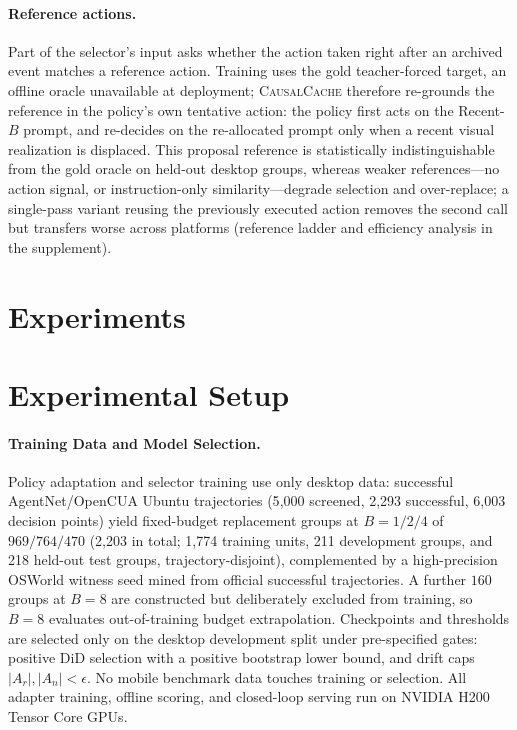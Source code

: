 \documentclass[letterpaper]{article} %
\newcommand{\method}{\textsc{CausalCache}}
\begin{document}
\paragraph{Reference actions.}
Part of the selector's input asks whether the action taken right after an
archived event matches a reference action. Training uses the gold
teacher-forced target, an offline oracle unavailable at deployment;
\method{} therefore re-grounds the reference in the policy's own tentative
action: the policy first acts on the Recent-$B$ prompt, and re-decides on
the re-allocated prompt only when a recent visual realization is
displaced. This proposal reference is statistically indistinguishable
from the gold oracle on held-out desktop groups, whereas weaker
references---no action signal, or instruction-only similarity---degrade
selection and over-replace; a single-pass variant reusing the previously
executed action removes the second call but transfers worse across
platforms (reference ladder and efficiency analysis in the supplement).

\section{Experiments}

\section{Experimental Setup}

\paragraph{Training Data and Model Selection.}

Policy adaptation and selector training use only desktop data: successful
AgentNet/OpenCUA Ubuntu trajectories (5{,}000 screened, 2{,}293 successful,
6{,}003 decision points) yield fixed-budget replacement groups at
$B{=}1/2/4$ of $969/764/470$ (2{,}203 in total; 1{,}774 training units, 211 development
groups, and 218 held-out test groups, trajectory-disjoint), complemented by a
high-precision OSWorld witness seed
mined from official successful trajectories. A further $160$ groups at
$B{=}8$ are constructed but deliberately excluded from training, so $B{=}8$
evaluates out-of-training budget extrapolation. Checkpoints and thresholds
are selected only on the desktop development split under pre-specified
gates: positive DiD selection with a positive bootstrap lower bound, and
drift caps $|A_r|,|A_n|<\epsilon$. No mobile benchmark data touches training
or selection. All adapter training, offline scoring, and closed-loop serving
run on NVIDIA H200 Tensor Core GPUs.
\end{document}
